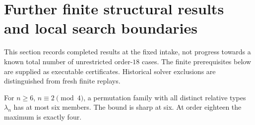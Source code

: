 \section{Further finite structural results and local search boundaries}
\label{sec:september30-ledger}

This section records completed results at the fixed intake, not progress
towards a known total number of unrestricted order-$18$ cases. The
finite prerequisites below are supplied as executable certificates.
Historical solver exclusions are distinguished from fresh finite replays.

\begin{corollary}
\label{cor:near-six-bound}
For $n\geq6$, $n\equiv2\pmod4$, a permutation family with all distinct
relative types $\lambda_n$ has at most six members. The bound is sharp
at six. At order eighteen the maximum is exactly four.
\end{corollary}
